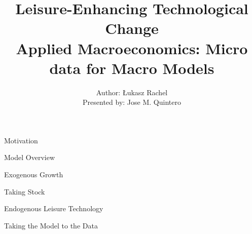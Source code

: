 \documentclass[usenames,dvipsnames]{beamer}
\title{Leisure-Enhancing Technological Change  \\ \small{Applied Macroeconomics: Micro data for Macro Models} }
\author{Author: Łukasz Rachel \\ 
Presented by: Jose M. Quintero}
\begin{document}
\begin{frame}
  \titlepage
\end{frame}

\begin{frame}{Motivation}
    
\end{frame}

\begin{frame}{Model Overview}
    
\end{frame}

\begin{frame}{Exogenous Growth}
    
\end{frame}

\begin{frame}{Taking Stock}
    
\end{frame}

\begin{frame}{Endogenous Leisure Technology}
    
\end{frame}

\begin{frame}{Taking the Model to the Data}
    
\end{frame}
\end{document}
